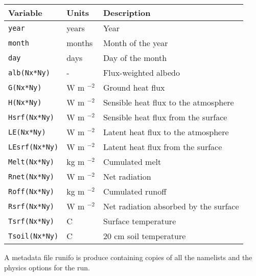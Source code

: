 \documentclass{article}
\begin{document}
\begin{tabular}{|l|l|l|}
\hline
Variable           & Units        & Description                          \\
\hline
{\tt year}         & years        & Year                                 \\
{\tt month}        & months       & Month of the year                    \\
{\tt day}          & days         & Day of the month                     \\
{\tt alb(Nx*Ny)}   & -            & Flux-weighted albedo                 \\
{\tt G(Nx*Ny)}     & W m $^{-2}$  & Ground heat flux                     \\
{\tt H(Nx*Ny)}     & W m $^{-2}$  & Sensible heat flux to the atmosphere \\
{\tt Hsrf(Nx*Ny)}  & W m $^{-2}$  & Sensible heat flux from the surface  \\
{\tt LE(Nx*Ny)}    & W m $^{-2}$  & Latent heat flux to the atmosphere   \\
{\tt LEsrf(Nx*Ny)} & W m $^{-2}$  & Latent heat flux from the surface    \\
{\tt Melt(Nx*Ny)}  & kg m $^{-2}$ & Cumulated melt                       \\
{\tt Rnet(Nx*Ny)}  & W m $^{-2}$  & Net radiation                        \\
{\tt Roff(Nx*Ny)}  & kg m $^{-2}$ & Cumulated runoff                     \\
{\tt Rsrf(Nx*Ny)}  & W m $^{-2}$  & Net radiation absorbed by the surface\\
{\tt Tsrf(Nx*Ny)}  & C            & Surface temperature                  \\
{\tt Tsoil(Nx*Ny)} & C            & 20 cm soil temperature               \\
\hline 
\end{tabular}

A metadata file runifo is produce containing copies of all the namelists and the physics options for the run.
 



\end{document}
